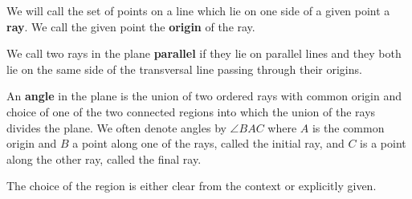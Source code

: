 \documentclass{ximera}
\begin{document}
\begin{definition} 
We will call the set of points on a line which lie on one side of a
given point a \textbf{ray}.  We call the given point the
\textbf{origin} of the ray.
\end{definition}

\begin{definition}
We call two rays in the plane \textbf{parallel} if they lie on
parallel lines and they both lie on the same side of the transversal
line passing through their origins.
\end{definition}

\begin{definition} An \textbf{angle} in the plane is the union of two ordered
rays with common origin and choice of one of the two connected regions
into which the union of the rays divides the plane. We often denote
angles by $\angle BAC$ where $A$ is the common origin and $B$ a point
along one of the rays, called the initial ray, and $C$ is a point
along the other ray, called the final ray.
\end{definition}


The choice of the region is either clear from the context or
explicitly given.
\end{document}
